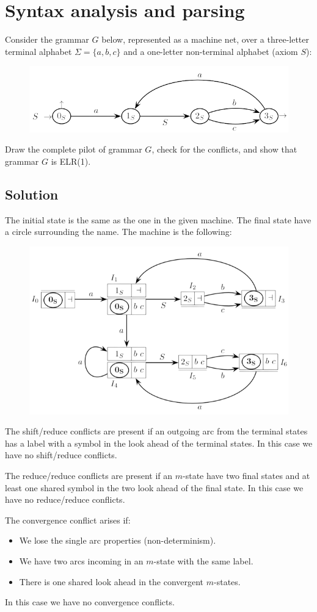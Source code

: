 \documentclass[12pt, a4paper]{report}
\begin{document}
    \newpage
    \section{Syntax analysis and parsing}
    Consider the grammar $G$ below, represented as a machine net, over a three-letter terminal alphabet $\Sigma=\{a,b,c\}$ and a one-letter non-terminal alphabet (axiom $S$):
    \begin{figure}[H]
        \centering
        \includegraphics[width=0.5\linewidth]{images/mnet.png}
    \end{figure}
    Draw the complete pilot of grammar $G$, check for the conflicts, and show that grammar $G$ is ELR(1).
    \subsection*{Solution}
    The initial state is the same as the one in the given machine. The final state have a circle surrounding the name. The machine is the following: 
    \begin{figure}[H]
        \centering
        \includegraphics[width=0.6\linewidth]{images/pilot.png}
    \end{figure} 
    The shift/reduce conflicts are present if an outgoing arc from the terminal states has a label with a symbol in the look ahead of the terminal states. 
    In this case we have no shift/reduce conflicts. 

    The reduce/reduce conflicts are present if an $m$-state have two final states and at least one shared symbol in the two look ahead of the final state. 
    In this case we have no reduce/reduce conflicts. 

    The convergence conflict arises if: 
    \begin{itemize}
        \item We lose the single arc properties (non-determinism). 
        \item We have two arcs incoming in an $m$-state with the same label. 
        \item There is one shared look ahead in the convergent $m$-states. 
    \end{itemize}
    In this case we have no convergence conflicts. 
\end{document}
